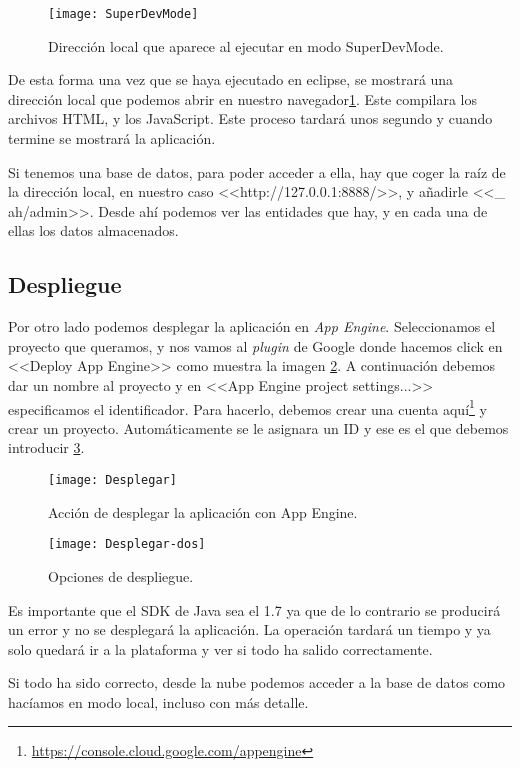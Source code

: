 \begin{figure}
\centering
\texttt{[image: SuperDevMode]}
\caption{Dirección local que aparece al ejecutar en modo SuperDevMode.}
\label{fig:5.4}
\end{figure}

De esta forma una vez que se haya ejecutado en eclipse, se mostrará una dirección local que podemos abrir en nuestro navegador\ref{fig:5.4}. Este compilara los archivos HTML, y los JavaScript. Este proceso tardará unos segundo y cuando termine se mostrará la aplicación.

Si tenemos una base de datos, para poder acceder a ella, hay que coger la raíz de la dirección local, en nuestro caso <<http://127.0.0.1:8888/>>, y añadirle <<\_ ah/admin>>. Desde ahí podemos ver las entidades que hay, y en cada una de ellas los datos almacenados.

\subsection{Despliegue}

Por otro lado podemos desplegar la aplicación en \emph{App Engine}. Seleccionamos el proyecto que queramos, y nos vamos al \emph{plugin} de Google donde hacemos click en <<Deploy App Engine>> como muestra la imagen \ref{fig:5.5}. A continuación debemos dar un nombre al proyecto y en <<App Engine project settings...>> especificamos el identificador. Para hacerlo, debemos crear una cuenta aquí\footnote{\url{https://console.cloud.google.com/appengine}} y crear un proyecto. Automáticamente se le asignara un ID y ese es el que debemos introducir \ref{fig:5.6}. 
\begin{figure}
\centering
\texttt{[image: Desplegar]}
\caption{Acción de desplegar la aplicación con App Engine.}
\label{fig:5.5}
\end{figure}

\begin{figure}
\centering
\texttt{[image: Desplegar-dos]}
\caption{Opciones de despliegue.}
\label{fig:5.6}
\end{figure}

Es importante que el SDK de Java sea el 1.7 ya que de lo contrario se producirá un error y no se desplegará la aplicación. La operación tardará un tiempo y ya solo quedará ir a la plataforma y ver si todo ha salido correctamente.

Si todo ha sido correcto, desde la nube podemos acceder a la base de datos como hacíamos en modo local, incluso con más detalle.

